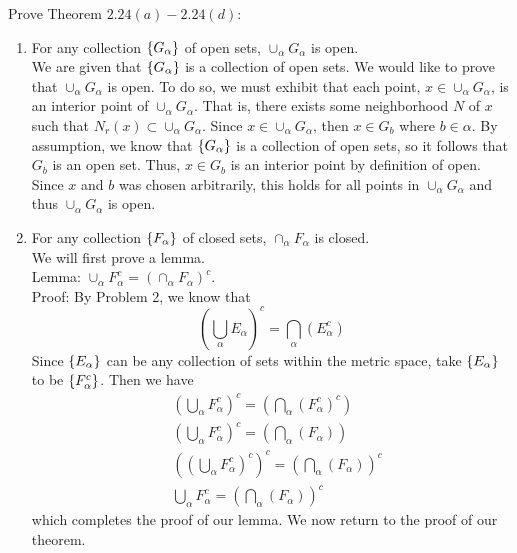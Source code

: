 \documentclass[12pt]{article}
\begin{document}
\problem  Prove Theorem $2.24(a) - 2.24(d)$: 
\begin{enumerate}
\item For any collection $\left\{G_{\alpha}\right\}$ of open sets, $\cup_{\alpha} G_{\alpha}$ is open. \\ 

We are given that $\left\{G_{\alpha}\right\}$  is a collection of open sets. We would like to prove that $\cup_{\alpha} G_{\alpha}$ is open.  To do so, we must exhibit that each point, $x \in \cup_{\alpha} G_{\alpha}$, is an interior point of $\cup_{\alpha} G_{\alpha}$. That is, there exists some neighborhood $N$ of $x$ such that $N_{r}(x) \subset \cup_{\alpha} G_{\alpha}$. Since  $x \in \cup_{\alpha} G_{\alpha}$,  then $x \in G_{b}$ where $b \in \alpha$. By assumption, we know that $\left\{G_{\alpha}\right\}$ is a collection of open sets, so it follows that $G_{b}$ is an open set. Thus, $x \in G_{b}$ is an interior point by definition of open. Since $x$ and $b$ was chosen arbitrarily, this holds for all points in $\cup_{\alpha} G_{\alpha}$ and thus $\cup_{\alpha} G_{\alpha}$ is open. \\

\item For any collection $\left\{F_{\alpha}\right\}$ of closed sets, $\cap_{\alpha} F_{\alpha}$ is closed. \\ 

We will first prove a lemma. \\ 

Lemma: $\cup_{\alpha} F_{\alpha}^{c} = (\cap_{\alpha} F_{\alpha})^{c}$. \\ 

Proof: By Problem 2, we know that 
\begin{equation}
\left( \bigcup_{\alpha}E_{\alpha} \right)^{c} = \bigcap_{\alpha}\left(E^{c}_{\alpha} \right)
\end{equation}
Since $\left\{E_{\alpha}\right\}$ can be any collection of sets within the metric space, take $\left\{E_{\alpha}\right\}$ to be $\left\{F^{c}_{\alpha}\right\}$. Then we have 
\begin{align}
& \left( \bigcup_{\alpha}F^{c}_{\alpha} \right)^{c} = \left( \bigcap_{\alpha}\left(F^{c}_{\alpha} \right)^{c} \right) \\ 
& \left( \bigcup_{\alpha}F^{c}_{\alpha} \right)^{c} = \left( \bigcap_{\alpha}\left(F_{\alpha} \right) \right) \\ 
& \left(  \left( \bigcup_{\alpha}F^{c}_{\alpha} \right)^{c} \right)^{c} = \left( \bigcap_{\alpha}\left(F_{\alpha} \right) \right)^{c} \\  
& \bigcup_{\alpha} F_{\alpha}^{c} = \left( \bigcap_{\alpha}\left(F_{\alpha} \right) \right)^{c}
\end{align} 
which completes the proof of our lemma. We now return to the proof of our theorem. \\ 


\end{enumerate}
\end{document}
